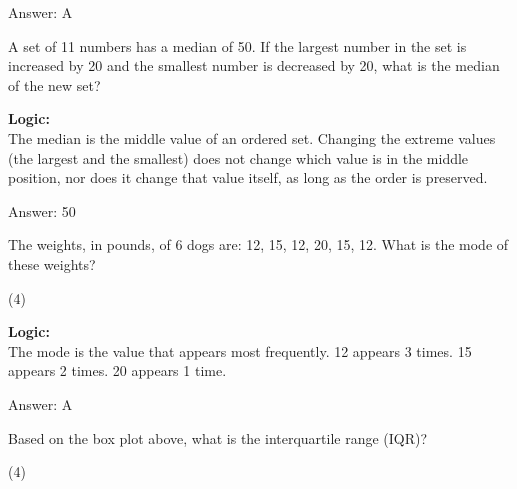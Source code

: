 \documentclass[11pt,paper=a4,answers]{exam}
\begin{document}
\begin{questions}
\begin{solution}
\vspace{30pt}

Answer: \colorbox{yellow!100}{A}
\end{solution}

\vspace{60pt}

\question
A set of 11 numbers has a median of 50. If the largest number in the set is increased by 20 and the smallest number is decreased by 20, what is the median of the new set?

\begin{solution}
\textbf{Logic:} \\
The median is the middle value of an ordered set. Changing the extreme values (the largest and the smallest) does not change which value is in the middle position, nor does it change that value itself, as long as the order is preserved.

\vspace{30pt}

Answer: \colorbox{yellow!100}{50}
\end{solution}

\vspace{60pt}

\question
The weights, in pounds, of 6 dogs are: 12, 15, 12, 20, 15, 12. What is the mode of these weights?
\begin{tasks}(4)
\end{tasks}

\begin{solution}
\textbf{Logic:} \\
The mode is the value that appears most frequently. 
12 appears 3 times. 
15 appears 2 times. 
20 appears 1 time.

\vspace{30pt}

Answer: \colorbox{yellow!100}{A}
\end{solution}

\vspace{60pt}

\question
\begin{center}
\end{center}
Based on the box plot above, what is the interquartile range (IQR)?
\begin{tasks}(4)
\end{tasks}


\end{questions}
\end{document}
